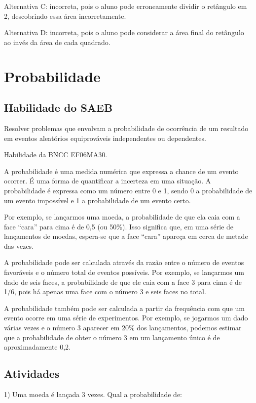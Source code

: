 Alternativa C: incorreta, pois o aluno pode erroneamente dividir o
retângulo em 2, descobrindo essa área incorretamente.

Alternativa D: incorreta, pois o aluno pode considerar a área final do
retângulo ao invés da área de cada quadrado.

\chapter{Probabilidade}

\section{Habilidade do SAEB}

Resolver problemas que envolvam a probabilidade de
ocorrência de um resultado em eventos aleatórios equiprováveis
independentes ou dependentes.

Habilidade da BNCC EF06MA30.

A probabilidade é uma medida numérica que expressa a chance de um evento
ocorrer. É uma forma de quantificar a incerteza em uma situação. A
probabilidade é expressa como um número entre 0 e 1, sendo 0 a
probabilidade de um evento impossível e 1 a probabilidade de um evento
certo.

Por exemplo, se lançarmos uma moeda, a probabilidade de que ela caia com
a face ``cara'' para cima é de 0,5 (ou 50\%). Isso significa que, em uma
série de lançamentos de moedas, espera-se que a face ``cara'' apareça em
cerca de metade das vezes.

A probabilidade pode ser calculada através da razão entre o número de
eventos favoráveis e o número total de eventos possíveis. Por exemplo,
se lançarmos um dado de seis faces, a probabilidade de que ele caia com
a face 3 para cima é de 1/6, pois há apenas uma face com o número 3 e
seis faces no total.

A probabilidade também pode ser calculada a partir da frequência com que
um evento ocorre em uma série de experimentos. Por exemplo, se jogarmos
um dado várias vezes e o número 3 aparecer em 20\% dos lançamentos,
podemos estimar que a probabilidade de obter o número 3 em um lançamento
único é de aproximadamente 0,2.

\section{Atividades}

1) Uma moeda é lançada 3 vezes. Qual a probabilidade de:

